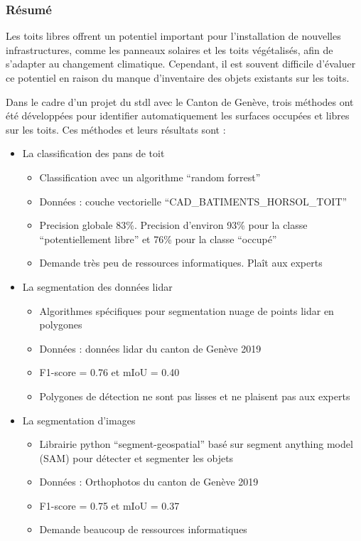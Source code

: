 {\subsubsection{Résumé}
\par{Les toits libres offrent un potentiel important pour l'installation de nouvelles infrastructures, comme les panneaux solaires et les toits végétalisés, afin de s'adapter au changement climatique. Cependant, il est souvent difficile d'évaluer ce potentiel en raison du manque d'inventaire des objets existants sur les toits.}

\par{Dans le cadre d'un projet \cite{herny_detection_2024} du \acrshort{stdl} avec le Canton de Genève, trois méthodes ont été développées pour identifier automatiquement les surfaces occupées et libres sur les toits. Ces méthodes et leurs résultats sont :}
\begin{itemize}
    \item La classification des pans de toit
    \begin{itemize}
        \item Classification avec un algorithme ``random forrest''
        \item Données : couche vectorielle ``CAD\_BATIMENTS\_HORSOL\_TOIT'' \cite{sitg_toits_nodate}
        \item Precision globale 83\%. Precision d'environ 93\% pour la classe ``potentiellement libre'' et 76\% pour la classe ``occupé''
        \item Demande très peu de ressources informatiques. Plaît aux experts
    \end{itemize}
    \item La segmentation des données \gls{lidar}
    \begin{itemize}
        \item Algorithmes spécifiques pour segmentation nuage de points \gls{lidar} en polygones
        \item Données : données \gls{lidar} du canton de Genève 2019 \cite{sitg_nuages_nodate}
        \item F1-score = 0.76 et mIoU = 0.40
        \item Polygones de détection ne sont pas lisses et ne plaisent pas aux experts
    \end{itemize}
    \item La segmentation d'images
    \begin{itemize}
        \item Librairie python ``segment-geospatial'' \cite{wu_samgeo_2023} basé sur segment anything model (SAM) pour détecter et segmenter les objets
        \item Données : Orthophotos du canton de Genève 2019 \cite{sitg_orthophotos_nodate}
        \item F1-score = 0.75 et mIoU = 0.37
        \item Demande beaucoup de ressources informatiques
    \end{itemize}
\end{itemize}

}
